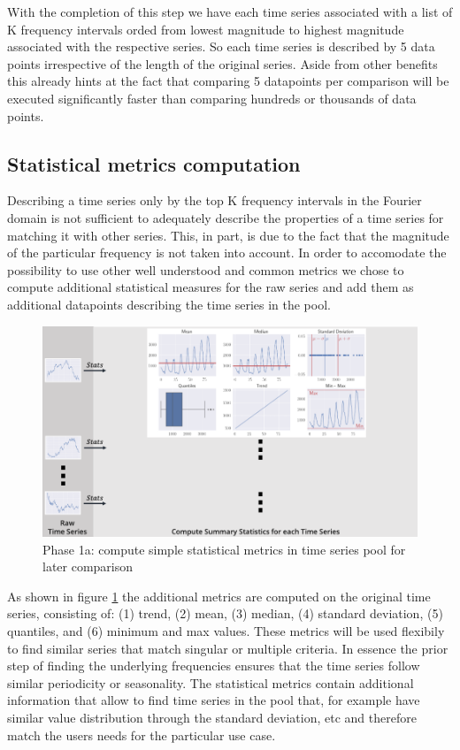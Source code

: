 \documentclass[phd,black, hidelinks]{PrincetonThesis}
\begin{document}
With the completion of this step we have each time series associated with a list of K frequency intervals orded from lowest magnitude to highest magnitude associated with the respective series. So each time series is described by 5 data points irrespective of the length of the original series. Aside from other benefits this already hints at the fact that comparing 5 datapoints per comparison will be executed significantly faster than comparing hundreds or thousands of data points.

\subsection{Statistical metrics computation}
\label{sec:org840d451}
\label{orgfc6d82a}
Describing a time series only by the top K frequency intervals in the Fourier domain is not sufficient to adequately describe the properties of a time series for matching it with other series. This, in part, is due to the fact that the magnitude of the particular frequency is not taken into account. In order to accomodate the possibility to use other well understood and common metrics we chose to compute additional statistical measures for the raw series and add them as additional datapoints describing the time series in the pool.

\begin{figure}[htbp]
\centering
\includegraphics[width=.9\linewidth]{./img/process_simple_stats.png}
\caption{\label{fig:orgce8f2b5}Phase 1a: compute simple statistical metrics in time series pool for later comparison}
\end{figure}

As shown in figure \ref{fig:orgce8f2b5} the additional metrics are computed on the original time series, consisting of: (1) trend, (2) mean, (3) median, (4) standard deviation, (5) quantiles, and (6) minimum and max values. These metrics will be used flexibily to find similar series that match singular or multiple criteria. In essence the prior step of finding the underlying frequencies ensures that the time series follow similar periodicity or seasonality. The statistical metrics contain additional information that allow to find time series in the pool that, for example have similar value distribution through the standard deviation, etc and therefore match the users needs for the particular use case.
\end{document}
